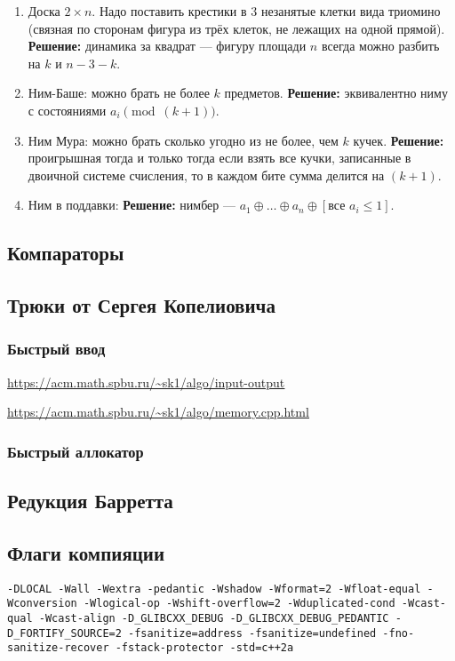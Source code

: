 \begin{enumerate}
\item Доска $2 \times n$. Надо поставить крестики в $3$ незанятые клетки вида триомино (связная по сторонам фигура из трёх клеток, не лежащих на одной прямой). \textbf{Решение:} динамика за квадрат --- фигуру площади $n$ всегда можно разбить на $k$ и $n-3-k$.
\item Ним-Баше: можно брать не более $k$ предметов. \textbf{Решение: } эквивалентно ниму с состояниями $a_i \pmod{(k+1)}$.
\item Ним Мура: можно брать сколько угодно из не более, чем $k$ кучек. \textbf{Решение:} проигрышная тогда и только тогда если взять все кучки, записанные в двоичной системе счисления, то в каждом бите сумма делится на $(k+1)$.
\item Ним в поддавки: \textbf{Решение:} нимбер --- $a_1 \oplus \ldots \oplus a_n \oplus [\text{все }a_i \le 1]$.
\end{enumerate}
\subsection{Компараторы}

\subsection{Трюки от Сергея Копелиовича}
\subsubsection{Быстрый ввод}
\underline{\url{https://acm.math.spbu.ru/~sk1/algo/input-output}}


\underline{\url{https://acm.math.spbu.ru/~sk1/algo/memory.cpp.html}}
\subsubsection{Быстрый аллокатор}

\subsection{Редукция Барретта}

\subsection{Флаги компияции}
\texttt{-DLOCAL -Wall -Wextra -pedantic -Wshadow -Wformat=2 -Wfloat-equal -Wconversion -Wlogical-op -Wshift-overflow=2 -Wduplicated-cond -Wcast-qual -Wcast-align -D\_GLIBCXX\_DEBUG -D\_GLIBCXX\_DEBUG\_PEDANTIC -D\_FORTIFY\_SOURCE=2 -fsanitize=address -fsanitize=undefined -fno-sanitize-recover -fstack-protector -std=c++2a}
